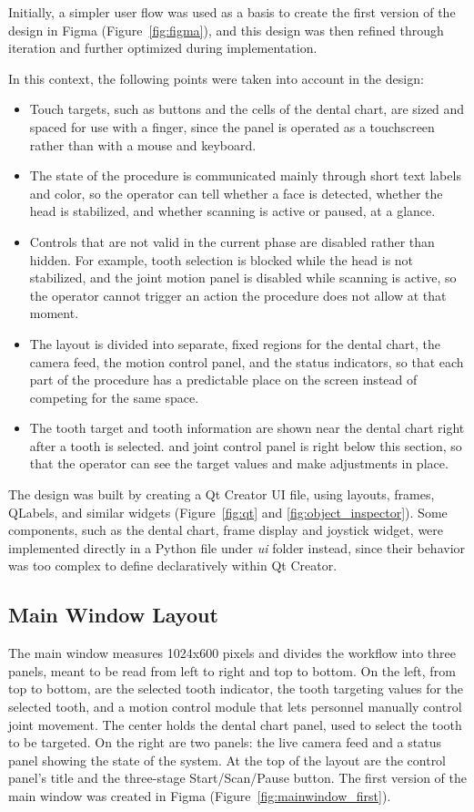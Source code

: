 Initially, a simpler user flow was used as a basis to create the first version of the design in Figma (Figure~\ref{fig:figma}), and this design was then refined through iteration and further optimized during implementation.

In this context, the following points were taken into account in the design:

\begin{itemize}
    \item Touch targets, such as buttons and the cells of the dental chart, are sized and spaced for use with a finger, since the panel is operated as a touchscreen rather than with a mouse and keyboard.
    \item The state of the procedure is communicated mainly through short text labels and color, so the operator can tell whether a face is detected, whether the head is stabilized, and whether scanning is active or paused, at a glance.
    \item Controls that are not valid in the current phase are disabled rather than hidden. For example, tooth selection is blocked while the head is not stabilized, and the joint motion panel is disabled while scanning is active, so the operator cannot trigger an action the procedure does not allow at that moment.
    \item The layout is divided into separate, fixed regions for the dental chart, the camera feed, the motion control panel, and the status indicators, so that each part of the procedure has a predictable place on the screen instead of competing for the same space.
    \item The tooth target and tooth information are shown near the dental chart right after a tooth is selected. and joint control panel is right below this section, so that the operator can see the target values and make adjustments in place.
\end{itemize}

The design was built by creating a Qt Creator UI file, using layouts, frames, QLabels, and similar widgets (Figure~\ref{fig:qt} and \ref{fig:object_inspector}). Some components, such as the dental chart, frame display and joystick widget, were implemented directly in a Python file under \textit{ui} folder instead, since their behavior was too complex to define declaratively within Qt Creator.


\subsection{Main Window Layout}
The main window measures 1024x600 pixels and divides the workflow into three panels, meant to be read from left to right and top to bottom. On the left, from top to bottom, are the selected tooth indicator, the tooth targeting values for the selected tooth, and a motion control module that lets personnel manually control joint movement. The center holds the dental chart panel, used to select the tooth to be targeted. On the right are two panels: the live camera feed and a status panel showing the state of the system. At the top of the layout are the control panel's title and the three-stage Start/Scan/Pause button. The first version of the main window was created in Figma (Figure~\ref{fig:mainwindow_first}).

